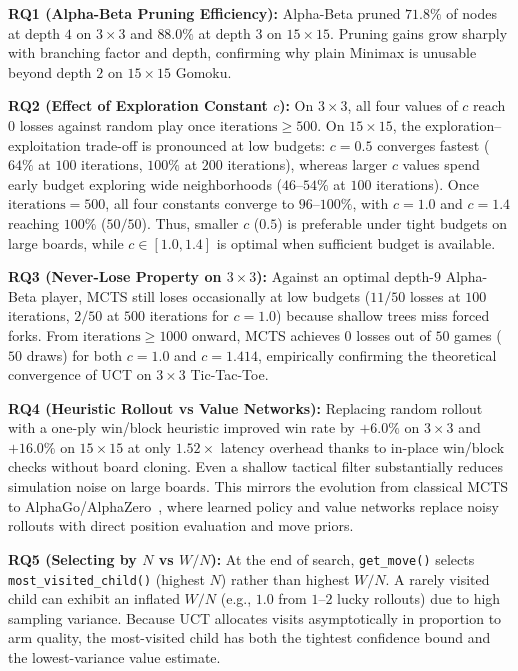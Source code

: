 \documentclass[conference]{IEEEtran}
\begin{document}
\textbf{RQ1 (Alpha-Beta Pruning Efficiency):} Alpha-Beta pruned $71.8\%$ of nodes at depth $4$ on $3\times 3$ and $88.0\%$ at depth $3$ on $15\times 15$. Pruning gains grow sharply with branching factor and depth, confirming why plain Minimax is unusable beyond depth $2$ on $15\times 15$ Gomoku.

\textbf{RQ2 (Effect of Exploration Constant $c$):} On $3\times 3$, all four values of $c$ reach $0$ losses against random play once $\text{iterations} \ge 500$. On $15\times 15$, the exploration--exploitation trade-off is pronounced at low budgets: $c = 0.5$ converges fastest ($64\%$ at $100$ iterations, $100\%$ at $200$ iterations), whereas larger $c$ values spend early budget exploring wide neighborhoods ($46$--$54\%$ at $100$ iterations). Once $\text{iterations} = 500$, all four constants converge to $96$--$100\%$, with $c = 1.0$ and $c = 1.4$ reaching $100\%$ ($50/50$). Thus, smaller $c$ ($0.5$) is preferable under tight budgets on large boards, while $c \in [1.0, 1.4]$ is optimal when sufficient budget is available.

\textbf{RQ3 (Never-Lose Property on $3\times 3$):} Against an optimal depth-$9$ Alpha-Beta player, MCTS still loses occasionally at low budgets ($11/50$ losses at $100$ iterations, $2/50$ at $500$ iterations for $c = 1.0$) because shallow trees miss forced forks. From $\text{iterations} \ge 1000$ onward, MCTS achieves $0$ losses out of $50$ games ($50$ draws) for both $c = 1.0$ and $c = 1.414$, empirically confirming the theoretical convergence of UCT on $3\times 3$ Tic-Tac-Toe.

\textbf{RQ4 (Heuristic Rollout vs Value Networks):} Replacing random rollout with a one-ply win/block heuristic improved win rate by $+6.0\%$ on $3\times 3$ and $+16.0\%$ on $15\times 15$ at only $1.52\times$ latency overhead thanks to in-place win/block checks without board cloning. Even a shallow tactical filter substantially reduces simulation noise on large boards. This mirrors the evolution from classical MCTS to AlphaGo/AlphaZero~\cite{silver2016}, where learned policy and value networks replace noisy rollouts with direct position evaluation and move priors.

\textbf{RQ5 (Selecting by $N$ vs $W/N$):} At the end of search, \texttt{get\_move()} selects \texttt{most\_visited\_child()} (highest $N$) rather than highest $W/N$. A rarely visited child can exhibit an inflated $W/N$ (e.g., $1.0$ from $1$--$2$ lucky rollouts) due to high sampling variance. Because UCT allocates visits asymptotically in proportion to arm quality, the most-visited child has both the tightest confidence bound and the lowest-variance value estimate.
\end{document}
